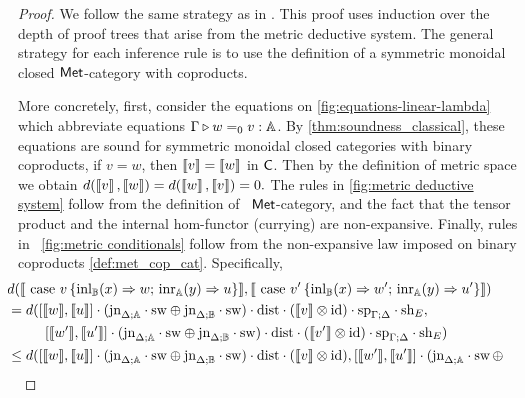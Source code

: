 \begin{proof}
 We follow the same strategy as in \cite{dahlqvist2023syntactic}.
 This proof uses induction over the depth of proof trees that
 arise from the metric deductive system. The general strategy for each
 inference rule is to use the definition of a symmetric monoidal closed $\mathsf{Met}$-category with coproducts. 

 More concretely, first, consider the equations on \autoref{fig:equations-linear-lambda} which abbreviate equations $\Gamma \triangleright w =_0 v : \mathbb{A}$. By \autoref{thm:soundness_classical}, these equations are sound for symmetric monoidal closed categories with binary coproducts, \ie if $v=w$, then $\left \llbracket v \right \rrbracket=\left \llbracket w \right \rrbracket$ in $ \mathsf{C}$. Then by the definition of metric space we obtain $d(\left \llbracket v \right \rrbracket,\left \llbracket w \right \rrbracket) = d(\left \llbracket w \right \rrbracket,\left \llbracket v \right \rrbracket)=0.$ 
 The rules in \autoref{fig:metric deductive system} follow from the definition of  $\mathsf{Met}$-category, and the fact that the tensor product and the internal hom-functor (currying) are non-expansive. 
 Finally, rules in  \autoref{fig:metric conditionals} follow from the non-expansive law imposed on binary coproducts \autoref{def:met_cop_cat}. Specifically,
  \begin{align*}
    & \hspace{-20pt} d( \llbracket  \text{ case } v \, \{\text{inl}_{\typeB}  (x) \Rightarrow w ; \, \text{inr}_{\typeA} (y) \Rightarrow u\}  \rrbracket, \llbracket \text{ case } v' \, \{\text{inl}_{\typeB}  (x) \Rightarrow w' ; \, \text{inr}_{\typeA} (y) \Rightarrow u'\} \rrbracket)  \\
    &  \hspace{-20pt} = d( [\llbracket w\rrbracket ,\llbracket u\rrbracket] \comp (\text{jn}_{\Delta;\typeA}\comp \sw \oplus \text{jn}_{\Delta;\typeB}\comp \sw) \comp \dist \comp (\llbracket v\rrbracket \otimes \text{id}) \comp \text{sp}_{\Gamma;\Delta} \comp \text{sh}_{E}, \\
    & \hspace{7pt} [\llbracket w'\rrbracket ,\llbracket u'\rrbracket] \comp (\text{jn}_{\Delta;\typeA}\comp \sw \oplus \text{jn}_{\Delta;\typeB}\comp \sw) \comp \dist \comp (\llbracket v'\rrbracket \otimes \text{id}) \comp \text{sp}_{\Gamma;\Delta} \comp \text{sh}_{E})\\
    & \hspace{-20pt} \leq  d( [\llbracket w\rrbracket ,\llbracket u\rrbracket] \comp (\text{jn}_{\Delta;\typeA}\comp \sw \oplus \text{jn}_{\Delta;\typeB}\comp \sw) \comp \dist \comp (\llbracket v\rrbracket \otimes \text{id}),  [\llbracket w'\rrbracket ,\llbracket u'\rrbracket] \comp (\text{jn}_{\Delta;\typeA}\comp \sw \, \oplus \\

\end{align*}
\end{proof}
